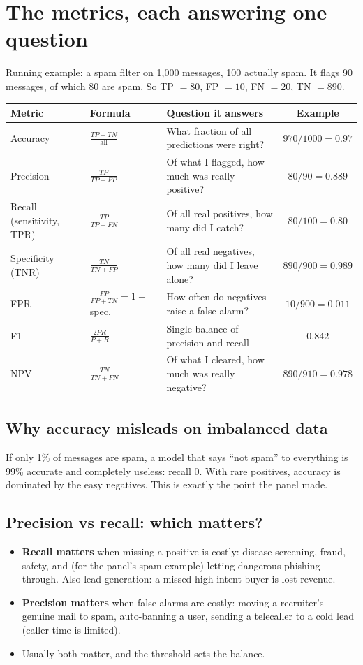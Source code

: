 \section{The metrics, each answering one question}
Running example: a spam filter on 1{,}000 messages, 100 actually spam. It flags 90 messages, of which 80 are spam.
So TP $= 80$, FP $= 10$, FN $= 20$, TN $= 890$.
\begin{center}\small
\begin{tabularx}{\linewidth}{l l X c}
\toprule
Metric & Formula & Question it answers & Example\\
\midrule
Accuracy & $\frac{TP + TN}{\text{all}}$ & What fraction of all predictions were right? & $970/1000 = 0.97$\\
Precision & $\frac{TP}{TP + FP}$ & Of what I flagged, how much was really positive? & $80/90 = 0.889$\\
Recall (sensitivity, TPR) & $\frac{TP}{TP + FN}$ & Of all real positives, how many did I catch? & $80/100 = 0.80$\\
Specificity (TNR) & $\frac{TN}{TN + FP}$ & Of all real negatives, how many did I leave alone? & $890/900 = 0.989$\\
FPR & $\frac{FP}{FP + TN} = 1 - $ spec. & How often do negatives raise a false alarm? & $10/900 = 0.011$\\
F1 & $\frac{2PR}{P + R}$ & Single balance of precision and recall & $0.842$\\
NPV & $\frac{TN}{TN + FN}$ & Of what I cleared, how much was really negative? & $890/910 = 0.978$\\
\bottomrule
\end{tabularx}
\end{center}

\subsection{Why accuracy misleads on imbalanced data}
If only 1\% of messages are spam, a model that says ``not spam'' to everything is 99\% accurate and completely useless:
recall 0. With rare positives, accuracy is dominated by the easy negatives. This is exactly the point the panel made.

\subsection{Precision vs recall: which matters?}
\begin{itemize}
\item \textbf{Recall matters} when missing a positive is costly: disease screening, fraud, safety, and (for the panel's spam
  example) letting dangerous phishing through. Also lead generation: a missed high-intent buyer is lost revenue.
\item \textbf{Precision matters} when false alarms are costly: moving a recruiter's genuine mail to spam, auto-banning a
  user, sending a telecaller to a cold lead (caller time is limited).
\item Usually both matter, and the threshold sets the balance.
\end{itemize}

